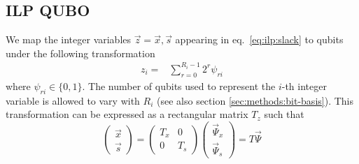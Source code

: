 \documentclass[prd,twocolumn,tightenlines,preprintnumbers,showpacs,superscriptaddress,notitlepage,nofootinbib,eqsecnum,floatfix,longbibliography,aps,10pt]{revtex4-2}
\begin{document}
\subsection{ILP QUBO}
\label{sec:results:qa1}
We map the integer variables $\vec z = \vec x, \vec s$ appearing in eq.~\eqref{eq:ilp:slack} to qubits under the following transformation~\cite{Chang:2018uoc}
\begin{align}
 z_i = & \sum_{r=0}^{R_i-1} 2^r \psi_{ri}
 \label{eq:int_to_bin}
\end{align}
where $\psi_{ri} \in \{0, 1\}$.
The number of qubits used to represent the $i$-th integer variable is allowed to vary with $R_i$ (see also section \ref{sec:methods:bit-basis}).
This transformation can be expressed as a rectangular matrix $T_z$ such that
\begin{equation}
    \begin{pmatrix}
        \vec x \\ \vec s
    \end{pmatrix}
    =
    \begin{pmatrix}
        T_x & 0 \\ 0 & T_s
    \end{pmatrix}
    \begin{pmatrix}
        \vec \Psi_x \\ \vec \Psi_s
    \end{pmatrix}
    =
    T
    \vec \Psi
\end{equation}
\end{document}
